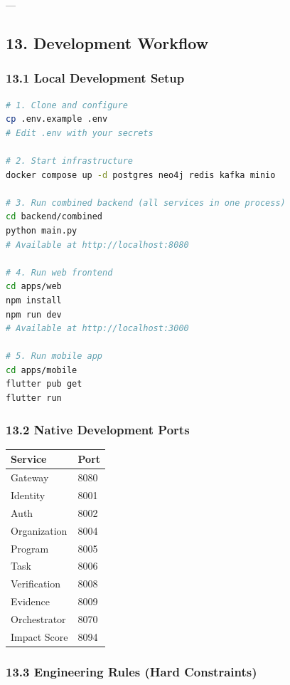 \documentclass[11pt,a4paper]{article}
\begin{document}
---

\subsection{13. Development Workflow}

\subsubsection{13.1 Local Development Setup}

\begin{lstlisting}[language=bash, caption=bash code]
# 1. Clone and configure
cp .env.example .env
# Edit .env with your secrets

# 2. Start infrastructure
docker compose up -d postgres neo4j redis kafka minio

# 3. Run combined backend (all services in one process)
cd backend/combined
python main.py
# Available at http://localhost:8080

# 4. Run web frontend
cd apps/web
npm install
npm run dev
# Available at http://localhost:3000

# 5. Run mobile app
cd apps/mobile
flutter pub get
flutter run
\end{lstlisting}

\subsubsection{13.2 Native Development Ports}

\begin{table}[H]
\centering
\begin{tabular}{|l|l|}
\hline
Service & Port \\
\hline
Gateway & 8080 \\
\hline
Identity & 8001 \\
\hline
Auth & 8002 \\
\hline
Organization & 8004 \\
\hline
Program & 8005 \\
\hline
Task & 8006 \\
\hline
Verification & 8008 \\
\hline
Evidence & 8009 \\
\hline
Orchestrator & 8070 \\
\hline
Impact Score & 8094 \\
\hline
\end{tabular}
\end{table}

\subsubsection{13.3 Engineering Rules (Hard Constraints)}
\end{document}
